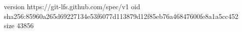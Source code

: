 version https://git-lfs.github.com/spec/v1
oid sha256:85960a265d69227134e53f6077d113879d12f85eb76a46847600fe8a1a5cc452
size 43856
